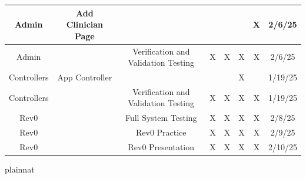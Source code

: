 \documentclass[12pt, titlepage]{article}
\begin{document}
\begin{landscape}
\begin{longtable}{|c|c|c|c|c|c|c|c|}
      Admin & Add Clinician Page & ~ & ~ & ~ & ~ & X & 2/6/25 \\ \hline
      Admin & ~ & Verification and Validation Testing & X & X & X & X & 2/6/25 \\ \hline
      Controllers & App Controller & ~ & ~ & ~ & X & ~ & 1/19/25 \\ \hline
      Controllers & ~ & Verification and Validation Testing & X & X & X & X & 1/19/25 \\ \hline
      Rev0 & ~ & Full System Testing & X & X & X & X & 2/8/25 \\ \hline
      Rev0 & ~ & Rev0 Practice & X & X & X & X & 2/9/25 \\ \hline
      Rev0 & ~ & Rev0 Presentation & X & X & X & X & 2/10/25 \\ \hline
\end{longtable}
\normalsize
\end{landscape}

 {plainnat}


\newpage{}
\end{document}
